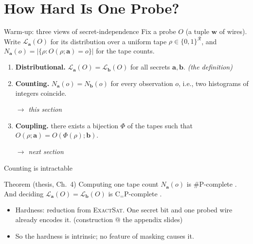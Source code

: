 \documentclass[aspectratio=169,10pt]{beamer}
\newcommand{\Rs}{\mathcal{R}}
\newcommand{\law}[1]{\mathcal{L}_{#1}}
\newcommand{\va}{\mathbf{a}}
\newcommand{\vb}{\mathbf{b}}
\newcommand{\CeqP}{\mathrm{C}_{=}\mathrm{P}}
\newcommand{\sharpP}{\#\mathrm{P}}
\begin{document}
\section{How Hard Is One Probe?}

\begin{frame}{Warm-up: three views of secret-independence}
  Fix a probe $O$ (a tuple $\mathbf{w}$ of wires). Write $\law{\va}(O)$ for its
  distribution over a uniform tape $\rho \in \{0,1\}^{\Rs}$, and
  $N_{\va}(o) = |\{\rho : O(\rho;\va) = o\}|$ for the tape counts.
  \medskip
  \begin{enumerate}
    \item<1-> \textbf{Distributional.} \; $\law{\va}(O) = \law{\vb}(O)$ for all
      secrets $\va, \vb$. \hfill {\small \emph{(the definition)}}
    \item<2-> \textbf{Counting.} \; $N_{\va}(o) = N_{\vb}(o)$ for every
      observation $o$, i.e., two histograms of integers coincide.
      
      {\small \emph{$\to$ this section}}
    \item<3-> \textbf{Coupling.} \; there exists a bijection
      $\Phi$ of the tapes such that $O(\rho;\va) = O(\Phi(\rho);\vb)$.
      
      {\small \emph{$\to$ next section}}
  \end{enumerate}
\end{frame}

\begin{frame}{Counting is intractable}
  \begin{block}{Theorem (thesis, Ch.~4)}
    Computing one tape count $N_{\va}(o)$ is $\sharpP$-complete
    \parencite{valiant1979complexity}. And deciding $\law{\va}(O) = \law{\vb}(O)$ is
    $\CeqP$-complete \parencite{wagner1986complexity}.
  \end{block}
  \medskip
  \begin{itemize}
    \item<2-> Hardness: reduction from \textsc{ExactSat}. One secret bit
      and one probed wire already encodes it.
      \hfill {\small(construction @ the appendix slides)}
    \item<2-> So the hardness is intrinsic; no feature of masking causes it.
  \end{itemize}
\end{frame}
\end{document}
